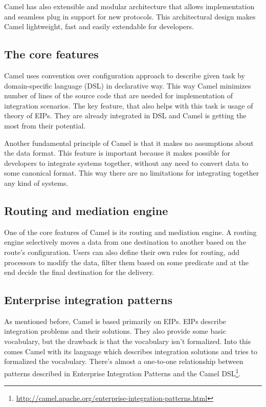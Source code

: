 \documentclass[12pt,final,oneside]{fithesis2}
\begin{document}
Camel has also extensible and modular architecture that allows implementation and seamless plug in support for new protocols. This architectural design makes Camel lightweight, fast and easily extendable for developers.\cite{camel-in-action}

\subsection{The core features}
Camel uses convention over configuration approach to describe given task by domain-specific language (DSL) in declarative way. This way Camel minimizes number of lines of the source code that are needed for implementation of integration scenarios. The key feature, that also helps with this task is usage of theory of EIPs. They are already integrated in DSL and Camel is getting the most from their potential. 

Another fundamental principle of Camel is that it makes no assumptions about the data format. This feature is important because it makes possible for developers to integrate systems together, without any need to convert data to some canonical format. This way there are no limitations for integrating together any kind of systems\cite{camel-in-action}.

\subsection*{Routing and mediation engine}
One of the core features of Camel is its routing and mediation engine. A routing engine selectively moves a data from one destination to another based on the route's configuration. Users can also define their own rules for routing, add processors to modify the data, filter them based on some predicate and at the end decide the final destination for the delivery.

\subsection*{Enterprise integration patterns}
As mentioned before, Camel is based primarily on EIPs. EIPs describe integration problems and their solutions. They also provide some basic vocabulary, but the drawback is that the vocabulary isn't formalized. Into this comes Camel with its language which describes integration solutions and tries to formalized the vocabulary. There's almost a one-to-one relationship between patterns described in
Enterprise Integration Patterns and the Camel DSL\footnote{\url{http://camel.apache.org/enterprise-integration-patterns.html}}.
\end{document}
